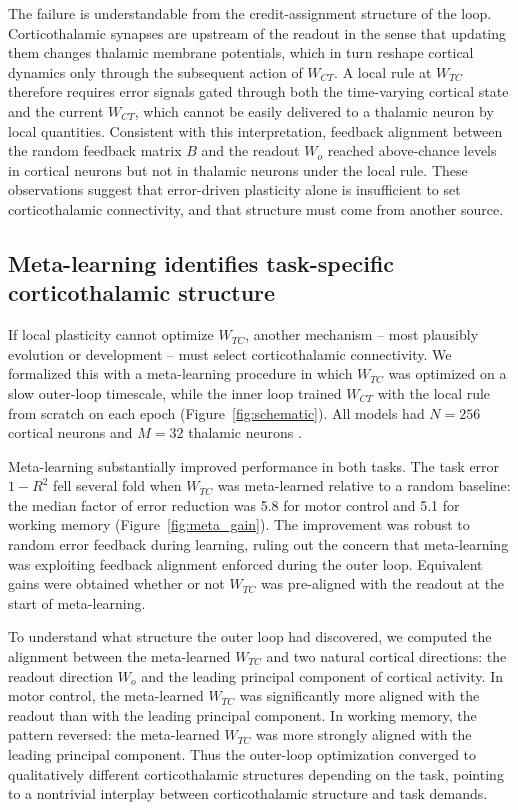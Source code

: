 \documentclass[11pt]{article}
\begin{document}
The failure is understandable from the credit-assignment structure of
the loop. Corticothalamic synapses are upstream of the readout in the
sense that updating them changes thalamic membrane potentials, which
in turn reshape cortical dynamics only through the subsequent action
of $W_{CT}$. A local rule at $W_{TC}$ therefore requires error signals
gated through both the time-varying cortical state and the current
$W_{CT}$, which cannot be easily delivered to a thalamic neuron by
local quantities. Consistent with this interpretation, feedback
alignment between the random feedback matrix $B$ and the readout
$W_o$ reached above-chance levels in cortical neurons but not in
thalamic neurons under the local rule. These observations suggest that
error-driven plasticity alone is insufficient to set corticothalamic
connectivity, and that structure must come from another source.

\subsection{Meta-learning identifies task-specific corticothalamic structure}

If local plasticity cannot optimize $W_{TC}$, another mechanism --
most plausibly evolution or development -- must select corticothalamic
connectivity. We formalized this with a meta-learning procedure in
which $W_{TC}$ was optimized on a slow outer-loop timescale, while the
inner loop trained $W_{CT}$ with the local rule from scratch on each
epoch (Figure~\ref{fig:schematic}). All models had $N = 256$ cortical
neurons and $M = 32$ thalamic neurons
\cite{wang2018prefrontal, hospedales2022meta}.

Meta-learning substantially improved performance in both tasks. The
task error $1 - R^2$ fell several fold when $W_{TC}$ was
meta-learned relative to a random baseline: the median factor of
error reduction was 5.8 for motor control and 5.1 for working memory
(Figure~\ref{fig:meta_gain}). The improvement was robust to random
error feedback during learning, ruling out the concern that
meta-learning was exploiting feedback alignment enforced during the
outer loop. Equivalent gains were obtained whether or not $W_{TC}$ was
pre-aligned with the readout at the start of meta-learning.

To understand what structure the outer loop had discovered, we
computed the alignment between the meta-learned $W_{TC}$ and two
natural cortical directions: the readout direction $W_o$ and the
leading principal component of cortical activity. In motor control,
the meta-learned $W_{TC}$ was significantly more aligned with the
readout than with the leading principal component. In working memory,
the pattern reversed: the meta-learned $W_{TC}$ was more strongly
aligned with the leading principal component. Thus the outer-loop
optimization converged to qualitatively different corticothalamic
structures depending on the task, pointing to a nontrivial interplay
between corticothalamic structure and task demands.
\end{document}
